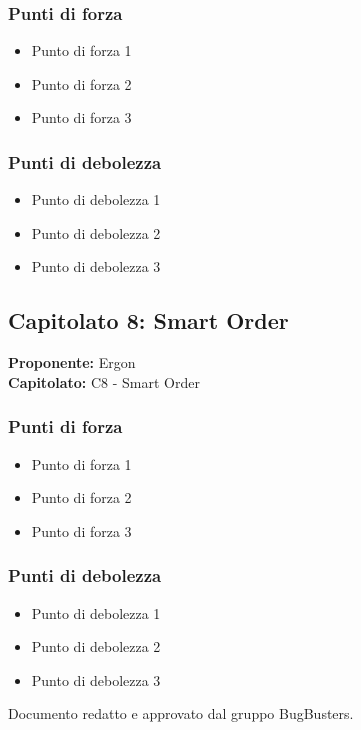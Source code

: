 \documentclass[a4paper,12pt]{article}
\begin{document}
\subsubsection{Punti di forza}
\begin{itemize}
\item Punto di forza 1
\item Punto di forza 2
\item Punto di forza 3
\end{itemize}

\subsubsection{Punti di debolezza}
\begin{itemize}
\item Punto di debolezza 1
\item Punto di debolezza 2
\item Punto di debolezza 3
\end{itemize}

\subsection{Capitolato 8: Smart Order}

\begin{tcolorbox}[colback=lightgray!30,colframe=darkgray,arc=2mm,boxrule=0.3pt]
\textbf{Proponente:} Ergon \\
\textbf{Capitolato:} C8 - Smart Order
\end{tcolorbox}

\subsubsection{Punti di forza}
\begin{itemize}
\item Punto di forza 1
\item Punto di forza 2
\item Punto di forza 3
\end{itemize}

\subsubsection{Punti di debolezza}
\begin{itemize}
\item Punto di debolezza 1
\item Punto di debolezza 2
\item Punto di debolezza 3
\end{itemize}

\vfill
\begin{center}
    {\small\color{darkgray} Documento redatto e approvato dal gruppo BugBusters.}
\end{center}
\end{document}
